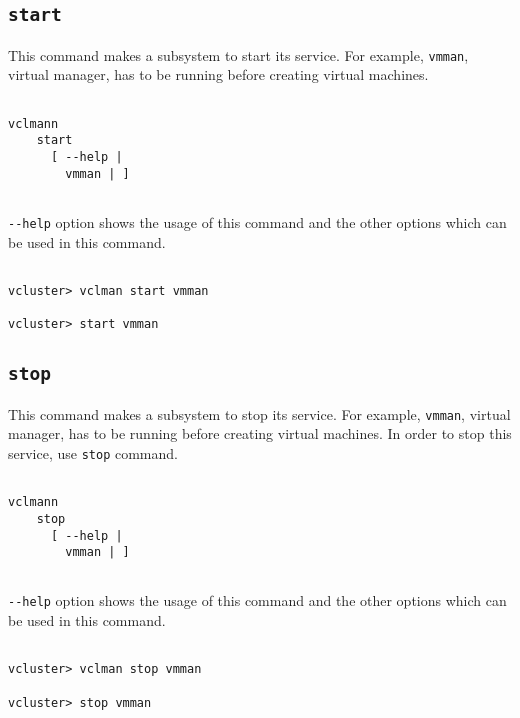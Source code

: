 \documentclass[11pt]{article}
\def \ttt{\texttt}
\def \vb{\verb}
\begin{document}
\subsection{\ttt{start}}

This command makes a subsystem to start its service. For example, \vb+vmman+, virtual manager, has to be running before creating virtual machines.

\begin{Verbatim}[fontfamily=courier, fontsize = \small, obeytabs
=true, tabsize=4, frame=lines]

vclmann 
    start
      [ --help |
        vmman | ] 
      
\end{Verbatim}

\vb+--help+ option shows the usage of this command and the other options which can be used in this command. 

\begin{Verbatim}[fontfamily=courier, fontsize = \small, obeytabs
=true, tabsize=4, frame=lines]

vcluster> vclman start vmman

vcluster> start vmman

\end{Verbatim}




\subsection{\ttt{stop}}

This command makes a subsystem to stop its service. For example, \vb+vmman+, virtual manager, has to be running before creating virtual machines. In order to stop this service, use \vb+stop+ command.

\begin{Verbatim}[fontfamily=courier, fontsize = \small, obeytabs
=true, tabsize=4, frame=lines]

vclmann 
    stop
      [ --help |
        vmman | ] 
      
\end{Verbatim}

\vb+--help+ option shows the usage of this command and the other options which can be used in this command. 

\begin{Verbatim}[fontfamily=courier, fontsize = \small, obeytabs
=true, tabsize=4, frame=lines]

vcluster> vclman stop vmman

vcluster> stop vmman

\end{Verbatim}
\end{document}
